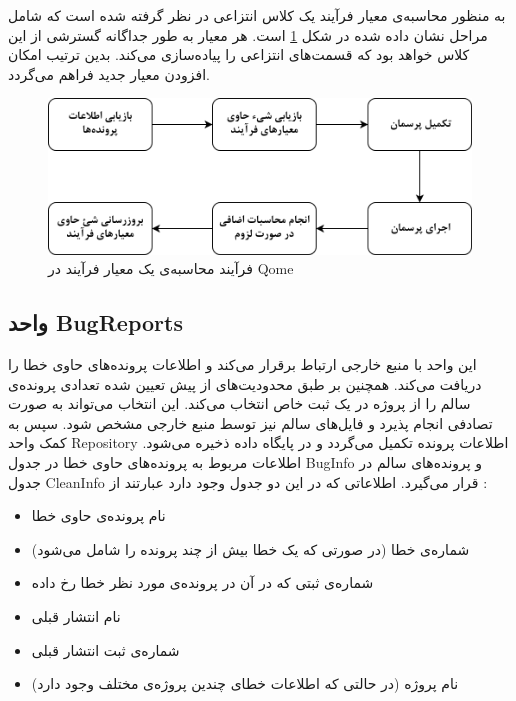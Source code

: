 به منظور محاسبه‌ی معیار فرآیند یک کلاس انتزاعی در نظر گرفته شده است که شامل مراحل نشان داده شده در شکل \ref{fig:process-chart}  است. هر معیار به طور جداگانه گسترشی از این کلاس خواهد بود که  قسمت‌های انتزاعی را پیاده‌سازی می‌کند. بدین ترتیب امکان افزودن معیار جدید فراهم می‌گردد. 
\begin{figure}[H]
	\centering
	\includegraphics[width=.8\textwidth]{img/method/process-chart.png}
	\caption{ فرآیند محاسبه‌ی یک معیار فرآیند در Qome}
	\label{fig:process-chart}
\end{figure}


\subsection{واحد BugReports  }
این واحد با منبع خارجی ارتباط برقرار می‌کند و اطلاعات پرونده‌های حاوی خطا را دریافت می‌کند. همچنین بر طبق محدودیت‌های از پیش تعیین شده تعدادی پرونده‌ی سالم را از پروژه در یک ثبت خاص انتخاب می‌کند. این انتخاب می‌تواند به صورت تصادفی انجام پذیرد و فایل‌های سالم نیز توسط منبع خارجی مشخص شود. سپس به کمک واحد Repository اطلاعات پرونده تکمیل می‌گردد و در پایگاه داده ذخیره می‌شود. اطلاعات مربوط به پرونده‌های حاوی خطا در جدول BugInfo و پرونده‌های سالم در جدول CleanInfo  قرار می‌گیرد. اطلاعاتی که در این دو جدول وجود دارد عبارتند از :
\begin{itemize}
	\item 
	نام پرونده‌ی حاوی خطا
	\item
	شماره‌ی خطا (در صورتی که یک خطا بیش از چند پرونده را شامل می‌شود)
	\item
	شماره‌ی ثبتی که در آن در پرونده‌ی مورد نظر خطا رخ داده
	\item
	نام انتشار قبلی
	\item
	شماره‌ی ثبت انتشار قبلی
	\item 
	نام پروژه (در حالتی که اطلاعات خطای چندین پروژه‌ی مختلف وجود دارد)
\end{itemize}

